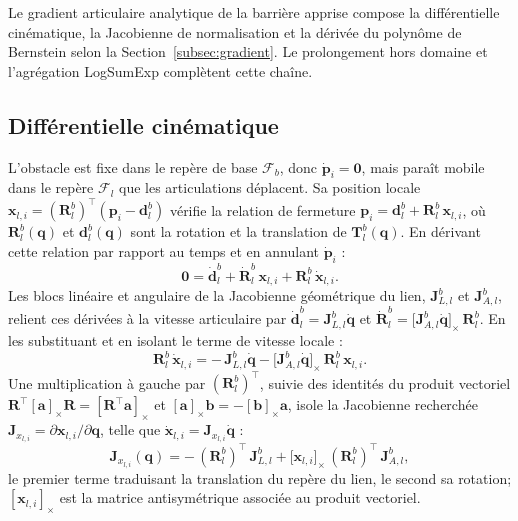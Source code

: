 \label{annexe:gradient_details}

Le gradient articulaire analytique de la barrière apprise compose la différentielle cinématique, la Jacobienne de normalisation et la dérivée du polynôme de Bernstein selon la Section~\ref{subsec:gradient}. Le prolongement hors domaine et l'agrégation LogSumExp complètent cette chaîne.

\subsection*{Différentielle cinématique} L'obstacle est fixe dans le repère de base $\mathcal{F}_b$, donc $\dot{\mathbf{p}}_i=\mathbf{0}$, mais paraît mobile dans le repère $\mathcal{F}_l$ que les articulations déplacent. Sa position locale $\mathbf{x}_{l,i}=(\mathbf{R}_{l}^{b})^{\top}(\mathbf{p}_i-\mathbf{d}_{l}^{b})$ vérifie la relation de fermeture $\mathbf{p}_i = \mathbf{d}_{l}^{b} + \mathbf{R}_{l}^{b}\,\mathbf{x}_{l,i}$, où $\mathbf{R}_{l}^{b}(\mathbf{q})$ et $\mathbf{d}_{l}^{b}(\mathbf{q})$ sont la rotation et la translation de $\mathbf{T}_{l}^{b}(\mathbf{q})$. En dérivant cette relation par rapport au temps et en annulant $\dot{\mathbf{p}}_i$ :
\begin{equation}
\mathbf{0} = \dot{\mathbf{d}}_{l}^{b} + \dot{\mathbf{R}}_{l}^{b}\,\mathbf{x}_{l,i} + \mathbf{R}_{l}^{b}\,\dot{\mathbf{x}}_{l,i}.
\end{equation}
Les blocs linéaire et angulaire de la Jacobienne géométrique du lien, $\mathbf{J}_{L,l}^{b}$ et $\mathbf{J}_{A,l}^{b}$, relient ces dérivées à la vitesse articulaire par $\dot{\mathbf{d}}_{l}^{b} = \mathbf{J}_{L,l}^{b}\dot{\mathbf{q}}$ et $\dot{\mathbf{R}}_{l}^{b} = \big[\mathbf{J}_{A,l}^{b}\dot{\mathbf{q}}\big]_\times\,\mathbf{R}_{l}^{b}$. En les substituant et en isolant le terme de vitesse locale :
\begin{equation}
\mathbf{R}_{l}^{b}\,\dot{\mathbf{x}}_{l,i}
= -\,\mathbf{J}_{L,l}^{b}\dot{\mathbf{q}}
- \big[\mathbf{J}_{A,l}^{b}\dot{\mathbf{q}}\big]_\times\,\mathbf{R}_{l}^{b}\,\mathbf{x}_{l,i}.
\end{equation}
Une multiplication à gauche par $(\mathbf{R}_{l}^{b})^{\top}$, suivie des identités du produit vectoriel $\mathbf{R}^{\top}[\mathbf{a}]_\times\mathbf{R}=[\mathbf{R}^{\top}\mathbf{a}]_\times$ et $[\mathbf{a}]_\times\mathbf{b}=-[\mathbf{b}]_\times\mathbf{a}$, isole la Jacobienne recherchée $\mathbf{J}_{x_{l,i}}=\partial\mathbf{x}_{l,i}/\partial\mathbf{q}$, telle que $\dot{\mathbf{x}}_{l,i}=\mathbf{J}_{x_{l,i}}\dot{\mathbf{q}}$ :
\begin{equation}
\mathbf{J}_{x_{l,i}}(\mathbf{q}) =
-\,(\mathbf{R}_{l}^{b})^{\top}\,\mathbf{J}_{L,l}^{b}
+ \big[\mathbf{x}_{l,i}\big]_\times\,(\mathbf{R}_{l}^{b})^{\top}\,\mathbf{J}_{A,l}^{b},
\end{equation}
le premier terme traduisant la translation du repère du lien, le second sa rotation; $[\mathbf{x}_{l,i}]_\times$ est la matrice antisymétrique associée au produit vectoriel.

